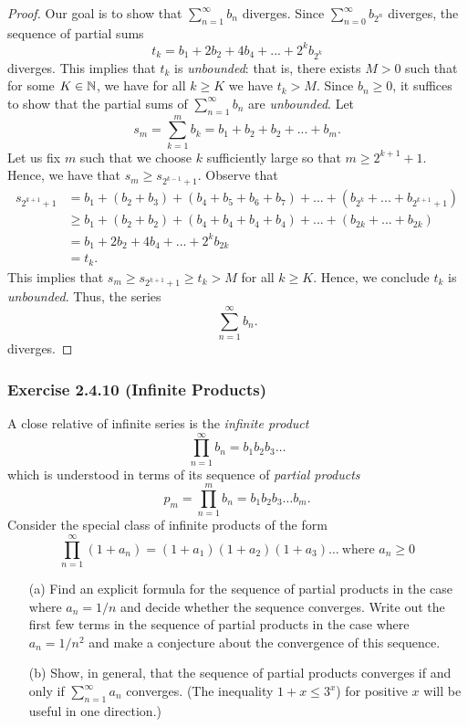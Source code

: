 \begin{proof}
    Our goal is to show that \( \sum_{n=1}^{ \infty} b_n\) diverges. Since \( \sum_{n=0}^{ \infty} b_{{2^n}} \) diverges, the sequence of partial sums 
    \[t_k = b_1 + 2b_2 + 4b_4 + ... + 2^k b_{2^k}\]
    diverges. This implies that \( t_k \) is \textit{unbounded}: that is, there exists \( M > 0 \) such that for some \( K \in \mathbb{N} \), we have for all \( k \geq K \) we have \( t_k > M \). Since \( b_n \geq 0\), it suffices to show that the partial sums of \( \sum_{n=1}^{ \infty} b_n\) are \textit{unbounded}. Let 
    \[ s_m = \sum_{k=1}^{m} b_k = b_1 + b_2 + b_2 + ... + b_m.  \]
    Let us fix \( m \) such that we choose \( k \) sufficiently large so that \( m \geq 2^{k+1} + 1 \). Hence, we have that \( s_m \geq s_{2^{k-1} + 1} \). Observe that 
    \begin{align*}
        s_{2^{k+1}+1} &= b_1 + (b_2 + b_3) + (b_4 + b_5 + b_6 + b_7) + ... + (b_{2^k} + ... + b_{2^{k+1}+1})  \\ 
                      &\geq b_1 + (b_2 + b_2) + (b_4 + b_4 + b_4 + b_4) + ... + (b_{2k} + ... + b_{2k}) \\
                      &= b_1 + 2b_2 + 4b_4 + ... + 2^k b_{2k} \\
                      &= t_k.
    \end{align*}
    This implies that \( s_m \geq s_{2^{k+1}+1} \geq t_k > M \) for all \( k \geq K\). Hence, we conclude \( t_k\) is \textit{unbounded}. Thus, the series 
    \[ \sum_{n=1}^{ \infty} b_n.\]
    diverges.
\end{proof}

















\subsubsection{Exercise 2.4.10 (Infinite Products)}
A close relative of infinite series is the \textit{infinite product} 
\[ \prod_{n=1}^{ \infty } b_n = b_1 b_2 b_3 \dots \]
which is understood in terms of its sequence of \textit{partial products}
\[ p_m = \prod_{n=1}^m b_n = b_1b_2b_3 \dots b_m.\]
Consider the special class of infinite products of the form 
\[ \prod_{n=1}^{ \infty} (1 + a_n) = (1+a_1)(1+a_2)(1+a_3) \dots ~ \text{where } a_n \geq 0 \]
\begin{enumerate}
    \item[(a)] Find an explicit formula for the sequence of partial products in the case where \( a_n = 1 / n \) and decide whether the sequence converges. Write out the first few terms in the sequence of partial products in the case where \( a_n = 1 / n^2\) and make a conjecture about the convergence of this sequence.
    \item[(b)] Show, in general, that the sequence of partial products converges if and only if \( \sum_{n=1}^{ \infty} a_n \) converges. (The inequality \( 1 + x \leq 3^x\)) for positive \( x \) will be useful in one direction.)
\end{enumerate}

